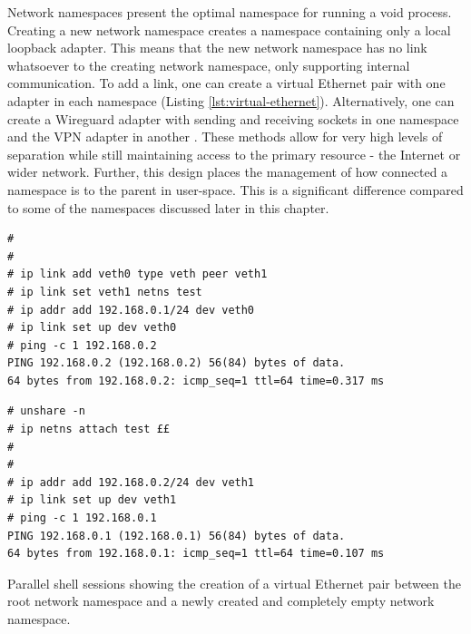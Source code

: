 \documentclass[12pt,a4paper,twoside]{report}
\begin{document}
Network namespaces present the optimal namespace for running a void process. Creating a new network namespace creates a namespace containing only a local loopback adapter. This means that the new network namespace has no link whatsoever to the creating network namespace, only supporting internal communication. To add a link, one can create a virtual Ethernet pair with one adapter in each namespace (Listing \ref{lst:virtual-ethernet}). Alternatively, one can create a Wireguard adapter with sending and receiving sockets in one namespace and the VPN adapter in another \citep[§7.3]{donenfeld_wireguard_2017}. These methods allow for very high levels of separation while still maintaining access to the primary resource - the Internet or wider network. Further, this design places the management of how connected a namespace is to the parent in user-space. This is a significant difference compared to some of the namespaces discussed later in this chapter.

\begin{listing}
\begin{minipage}{.49\textwidth}

\begin{verbatim}
#
#
# ip link add veth0 type veth peer veth1
# ip link set veth1 netns test
# ip addr add 192.168.0.1/24 dev veth0
# ip link set up dev veth0
# ping -c 1 192.168.0.2
PING 192.168.0.2 (192.168.0.2) 56(84) bytes of data.
64 bytes from 192.168.0.2: icmp_seq=1 ttl=64 time=0.317 ms
\end{verbatim}

\end{minipage}\hfill
\begin{minipage}{.49\textwidth}

\begin{verbatim}
# unshare -n
# ip netns attach test ££
#
#
# ip addr add 192.168.0.2/24 dev veth1
# ip link set up dev veth1
# ping -c 1 192.168.0.1
PING 192.168.0.1 (192.168.0.1) 56(84) bytes of data.
64 bytes from 192.168.0.1: icmp_seq=1 ttl=64 time=0.107 ms
\end{verbatim}

\end{minipage}

\caption{Parallel shell sessions showing the creation of a virtual Ethernet pair between the root network namespace and a newly created and completely empty network namespace.}
\label{lst:virtual-ethernet}
\end{listing}
\end{document}
